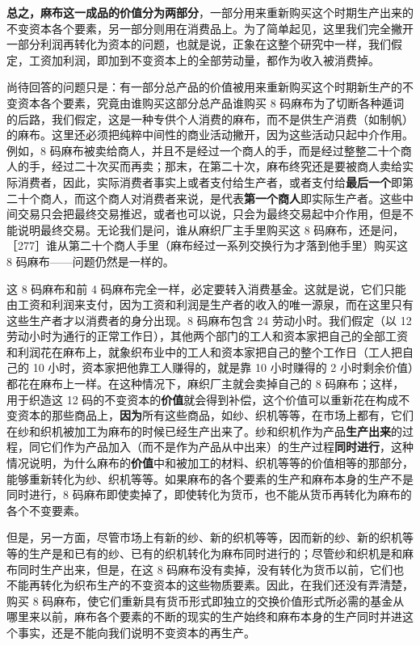 \textbf{总之，麻布这一成品的价值分为两部分}，一部分用来重新购买这个时期生产出来的不变资本各个要素，另一部分则用在消费品上。为了简单起见，这里我们完全撇开一部分利润再转化为资本的问题，也就是说，正象在这整个研究中一样，我们假定，工资加利润，即加到不变资本上的全部劳动量，都作为收入被消费掉。

尚待回答的问题只是：有一部分总产品的价值被用来重新购买这个时期新生产的不变资本各个要素，究竟由谁购买这部分总产品谁购买 8 码麻布为了切断各种遁词的后路，我们假定，这是一种专供个人消费的麻布，而不是供生产消费（如制帆）的麻布。这里还必须把纯粹中间性的商业活动撇开，因为这些活动只起中介作用。例如，8 码麻布被卖给商人，并且不是经过一个商人的手，而是经过整整二十个商人的手，经过二十次买而再卖；那末，在第二十次，麻布终究还是要被商人卖给实际消费者，因此，实际消费者事实上或者支付给生产者，或者支付给\textbf{最后一个}即第二十个商人，而这个商人对消费者来说，是代表\textbf{第一个商人}即实际生产者。这些中间交易只会把最终交易推迟，或者也可以说，只会为最终交易起中介作用，但是不能说明最终交易。无论我们是问，谁从麻织厂主手里购买这 8 码麻布，还是问，［277］谁从第二十个商人手里（麻布经过一系列交换行为才落到他手里）购买这 8 码麻布——问题仍然是一样的。

这 8 码麻布和前 4 码麻布完全一样，必定要转入消费基金。这就是说，它们只能由工资和利润来支付，因为工资和利润是生产者的收入的唯一源泉，而在这里只有这些生产者才以消费者的身分出现。8 码麻布包含 24 劳动小时。我们假定（以 12 劳动小时为通行的正常工作日），其他两个部门的工人和资本家把自己的全部工资和利润花在麻布上，就象织布业中的工人和资本家把自己的整个工作日（工人把自己的 10 小时，资本家把他靠工人赚得的，就是靠 10 小时赚得的 2 小时剩余价值）都花在麻布上一样。在这种情况下，麻织厂主就会卖掉自己的 8 码麻布；这样，用于织造这 12 码的不变资本的\textbf{价值}就会得到补偿，这个价值可以重新花在构成不变资本的那些商品上，\textbf{因为}所有这些商品，如纱、织机等等，在市场上都有，它们在纱和织机被加工为麻布的时候已经生产出来了。纱和织机作为产品\textbf{生产出来}的过程，同它们作为产品加入（而不是作为产品从中出来）的生产过程\textbf{同时进行}，这种情况说明，为什么麻布的\textbf{价值}中和被加工的材料、织机等等的价值相等的那部分，能够重新转化为纱、织机等等。如果麻布的各个要素的生产和麻布本身的生产不是同时进行，8 码麻布即使卖掉了，即使转化为货币，也不能从货币再转化为麻布的各个不变要素。

但是，另一方面，尽管市场上有新的纱、新的织机等等，因而新的纱、新的织机等等的生产是和已有的纱、已有的织机转化为麻布同时进行的；尽管纱和织机是和麻布同时生产出来，但是，在这 8 码麻布没有卖掉，没有转化为货币以前，它们也不能再转化为织布生产的不变资本的这些物质要素。因此，在我们还没有弄清楚，购买 8 码麻布，使它们重新具有货币形式即独立的交换价值形式所必需的基金从哪里来以前，麻布各个要素的不断的现实的生产始终和麻布本身的生产同时并进这个事实，还是不能向我们说明不变资本的再生产。

